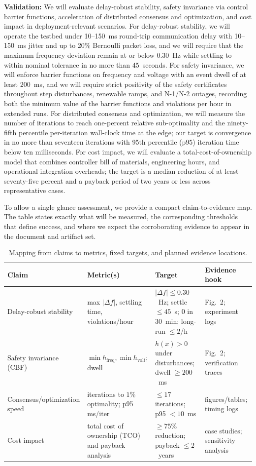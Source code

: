 \documentclass[12pt]{article}
\begin{document}
\textbf{Validation:} We will evaluate delay-robust stability, safety invariance via control barrier functions, acceleration of distributed consensus and optimization, and cost impact in deployment-relevant scenarios. For delay-robust stability, we will operate the testbed under 10--150~ms round-trip communication delay with 10--150~ms jitter and up to 20\% Bernoulli packet loss, and we will require that the maximum frequency deviation remain at or below 0.30~Hz while settling to within nominal tolerance in no more than 45~seconds. For safety invariance, we will enforce barrier functions on frequency and voltage with an event dwell of at least 200~ms, and we will require strict positivity of the safety certificates throughout step disturbances, renewable ramps, and N-1/N-2 outages, recording both the minimum value of the barrier functions and violations per hour in extended runs. For distributed consensus and optimization, we will measure the number of iterations to reach one-percent relative sub-optimality and the ninety-fifth percentile per-iteration wall-clock time at the edge; our target is convergence in no more than seventeen iterations with 95th percentile (p95) iteration time below ten milliseconds. For cost impact, we will evaluate a total-cost-of-ownership model that combines controller bill of materials, engineering hours, and operational integration overheads; the target is a median reduction of at least seventy-five percent and a payback period of two years or less across representative cases.

To allow a single glance assessment, we provide a compact claim-to-evidence map. The table states exactly what will be measured, the corresponding thresholds that define success, and where we expect the corroborating evidence to appear in the document and artifact set.

\begin{table}[t]
\centering
\small
\begin{tabular}{|p{2.9cm}|p{4.1cm}|p{3.2cm}|p{3.0cm}|}
\hline
\textbf{Claim} & \textbf{Metric(s)} & \textbf{Target} & \textbf{Evidence hook} \\
\hline
Delay-robust stability & max $|\Delta f|$, settling time, violations/hour & $|\Delta f| \leq 0.30$~Hz; settle $\leq 45$~s; $0$ in 30~min; long-run $\leq 2$/h & Fig.~2; experiment logs \\
\hline
Safety invariance (CBF) & $\min h_{\mathrm{freq}}, \min h_{\mathrm{volt}}$; dwell & $h(x)>0$ under disturbances; dwell $\ge 200$~ms & Fig.~2; verification traces \\
\hline
Consensus/\newline optimization speed & iterations to $1\%$ optimality; p95 ms/iter & $\le 17$ iterations; p95 $<10$~ms & figures/tables; timing logs \\
\hline
Cost impact & total cost of ownership (TCO) and payback analysis & $\ge 75\%$ reduction; payback $\le 2$~years & case studies; sensitivity analysis \\
\hline
\end{tabular}
\caption{Mapping from claims to metrics, fixed targets, and planned evidence locations.}
\label{tab:claims}
\end{table}
\end{document}

